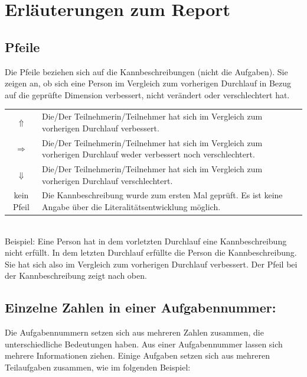 \documentclass{article}
\begin{document}
\setlength{\fboxsep}{0pt}%
\section*{Erläuterungen zum Report}
\subsection*{Pfeile}
Die Pfeile beziehen sich auf die Kannbeschreibungen (nicht die Aufgaben). Sie zeigen an, ob sich eine Person im Vergleich zum vorherigen Durchlauf in Bezug auf die geprüfte Dimension verbessert, nicht verändert oder verschlechtert hat.
\vspace{.5em}\\
\begin{tabular}{cl}
$\Uparrow$ & Die/Der Teilnehmerin/Teilnehmer hat sich im Vergleich zum vorherigen Durchlauf verbessert.\\
$\Rightarrow$ & Die/Der Teilnehmerin/Teilnehmer hat sich im Vergleich zum vorherigen Durchlauf weder verbessert noch verschlechtert.\\
$\Downarrow$ & Die/Der Teilnehmerin/Teilnehmer hat sich im Vergleich zum vorherigen Durchlauf verschlechtert.\\
kein Pfeil & Die Kannbeschreibung wurde zum ersten Mal geprüft. Es ist keine Angabe über die Literalitätsentwicklung möglich.\\
\end{tabular}
\vspace{.5em}\\
\noindent Beispiel: Eine Person hat in dem vorletzten Durchlauf eine Kannbeschreibung nicht erfüllt. In dem letzten Durchlauf erfüllte die Person die Kannbeschreibung. Sie hat sich also im Vergleich zum vorherigen Durchlauf verbessert. Der Pfeil bei der Kannbeschreibung zeigt nach oben.


\subsection*{Einzelne Zahlen in einer Aufgabennummer:}
Die Aufgabennummern setzen sich aus mehreren Zahlen zusammen, die unterschiedliche Bedeutungen haben. Aus einer Aufgabennummer lassen sich mehrere Informationen ziehen. Einige Aufgaben setzen sich aus mehreren Teilaufgaben zusammen, wie im folgenden Beispiel:
\vspace{0.5em}\\
\end{document}
